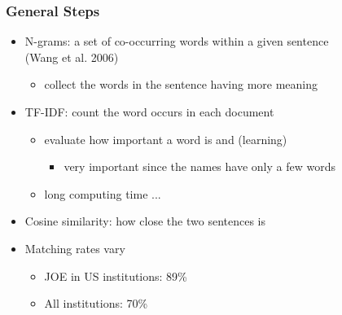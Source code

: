 \documentclass[10pt,svgnames,fragile]{beamer}
\begin{document}
\begin{frame}[label=appendix]
	\frametitle{General Steps}
	\begin{itemize}
		\item N-grams: a set of co-occurring words within a given sentence\\ (Wang et al. 2006)
		\begin{itemize}
			\item collect the words in the sentence having more meaning
		\end{itemize}
	\vfill
		\item TF-IDF: count the word occurs in each document
		\begin{itemize}
			\item evaluate how important a word is and (learning)
			\begin{itemize}
				\item very important since the names have only a few words
			\end{itemize}
			\item long computing time ...
		\end{itemize}
	\vfill
		\item Cosine similarity: how close the two sentences is
	\vfill
		\item Matching rates vary
		\begin{itemize}
			\item JOE in US institutions: 89\%
			\item All institutions: 70\%
		\end{itemize}
	\end{itemize}
	\hyperlink{Data}{}
\vfill
\end{frame}

%
%
\end{document}
